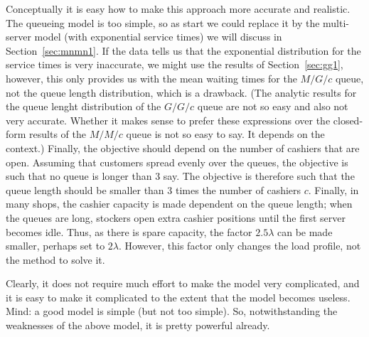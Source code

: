 Conceptually it is easy how to make this approach more accurate and
realistic. The queueing model is too simple, so as start we could
replace it by the multi-server model (with exponential service times)
we will discuss in Section~\ref{sec:mnmn1}. If the data tells us that
the exponential distribution for the service times is very inaccurate,
we might use the results of Section~\ref{sec:gg1}, however, this only
provides us with the mean waiting times for the $M/G/c$ queue, not the
queue length distribution, which is a drawback. (The analytic results
for the queue lenght distribution of the $G/G/c$ queue are not so easy
and also not very accurate. Whether it makes sense to prefer these
expressions over the closed-form results of the $M/M/c$ queue is not
so easy to say. It depends on the context.) Finally, the objective
should depend on the number of cashiers that are open. Assuming that
customers spread evenly over the queues, the objective is such that no
queue is longer than 3 say. The objective is therefore such that the
queue length should be smaller than $3$ times the number of cashiers
$c$. Finally, in many shops, the cashier capacity is made dependent on
the queue length; when the queues are long, stockers open extra
cashier positions until the first server becomes idle. Thus, as there
is spare capacity, the factor $2.5 \lambda$ can be made smaller,
perhaps set to $2\lambda$. However, this factor only changes the load
profile, not the method to solve it.

Clearly, it does not require much effort to make the model very
complicated, and it is easy to make it complicated to the extent that
the model becomes useless. Mind: a good model is simple (but not too
simple). So, notwithstanding the weaknesses of the above model, it is
pretty powerful already. 


